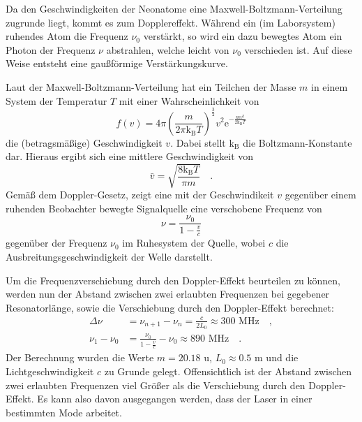 Da den Geschwindigkeiten der Neonatome eine Maxwell-Boltzmann-Verteilung
zugrunde liegt, kommt es zum Dopplereffekt. Während ein (im Laborsystem)
ruhendes Atom die Frequenz $\nu_0$ verstärkt, so wird ein dazu bewegtes
Atom ein Photon der Frequenz $\nu$ abstrahlen, welche leicht von $\nu_0$
verschieden ist. Auf diese Weise entsteht eine gaußförmige Verstärkungskurve.

Laut der Maxwell-Boltzmann-Verteilung hat ein Teilchen der Masse $m$ in einem 
System der Temperatur $T$ mit einer Wahrscheinlichkeit von
\begin{equation}
f(v)=4\pi \left( \frac{m}{2\pi \text{k}_\text{B} T} \right)^\frac{3}{2} v^2 
\text{e}^{-\frac{mv^2}{2\text{k}_\text{B}T}}
\end{equation}
die (betragsmäßige) Geschwindigkeit $v$. Dabei stellt $\text{k}_\text{B}$ die 
Boltzmann-Konstante dar. Hieraus ergibt sich eine mittlere Geschwindigkeit von 
\begin{equation}
\bar{v}=\sqrt{\frac{8\text{k}_\text{B}T}{\pi m}} \quad .
\end{equation}
Gemäß dem Doppler-Gesetz, zeigt eine mit der Geschwindikeit $v$ gegenüber einem 
ruhenden Beobachter bewegte Signalquelle eine verschobene Frequenz von 
\begin{equation}
\nu = \frac{\nu_0}{1-\frac{v}{c}}
\end{equation}
gegenüber der Frequenz $\nu_0$ im Ruhesystem der Quelle, wobei $c$ die 
Ausbreitungsgeschwindigkeit der Welle darstellt.


Um die Frequenzverschiebung durch den Doppler-Effekt beurteilen zu können, werden 
nun der Abstand zwischen zwei erlaubten Frequenzen bei gegebener Resonatorlänge,
sowie die Verschiebung durch den Doppler-Effekt berechnet:
\begin{align}
\Delta \nu &= \nu_{n+1}-\nu_n=\frac{c}{2 L_0} \approx 300\text{ MHz} \quad , \\
\nu _1 -\nu_0&=  \frac{\nu_0}{1-\frac{\bar{v}}{c}}-\nu_0 \approx 890 \text{ MHz} \quad .
\end{align}
Der Berechnung wurden die Werte $m=20.18 \text{ u}$, $L_0\approx 0.5 \text{ m}$ und  
die Lichtgeschwindigkeit $c$ zu Grunde gelegt. Offensichtlich ist der Abstand 
zwischen zwei erlaubten Frequenzen viel Größer als die Verschiebung durch den 
Doppler-Effekt. Es kann also davon ausgegangen werden, dass der Laser in einer 
bestimmten Mode arbeitet.